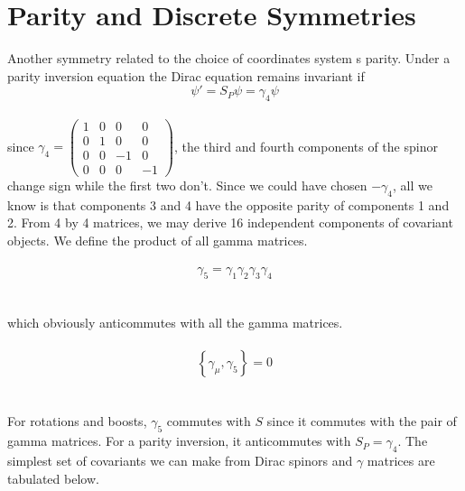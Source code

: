 \documentclass{report}
\begin{document}
\section{Parity and Discrete Symmetries}
Another symmetry related to the choice of coordinates system s parity. Under a parity inversion equation the Dirac equation remains invariant if
\begin{equation}
	\psi' = S_{P}\psi = \gamma_4 \psi
\end{equation}
\\
since $\displaystyle \gamma_4 = \begin{pmatrix} 1 & 0 & 0 & 0 \\ 0 & 1 & 0 & 0 \\ 0 & 0 & -1 & 0 \\ 0 & 0 & 0 & -1 \end{pmatrix} $, the third and fourth components of the spinor change sign while the first two don't. Since we could have chosen $\displaystyle -\gamma_4$, all we know is that components 3 and 4 have the opposite parity of components 1 and 2. From 4 by 4 matrices, we may derive 16 independent components of covariant objects. We define the product of all gamma matrices.
\\
\\
\begin{equation}
	\gamma_5 = \gamma_1 \gamma_2 \gamma_3 \gamma_4
\end{equation}
\\
\\
which obviously anticommutes with all the gamma matrices.
\\
\\
\begin{equation}
	\left\{ \gamma_{\mu}, \gamma_5 \right\} = 0
\end{equation}
\\
\\
For rotations and boosts, $\gamma_{5}$ commutes with $S$ since it commutes with the pair of gamma matrices. For a parity inversion, it anticommutes with  $\displaystyle S_{P} = \gamma_4$. The simplest set of covariants we can make from Dirac spinors and $\gamma$ matrices are tabulated below.
\\
\\
\end{document}
